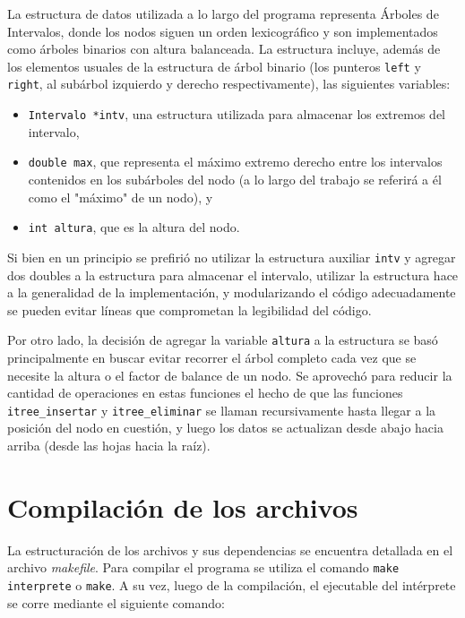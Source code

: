 \documentclass[11pt]{article}
\begin{document}
 La estructura de datos utilizada a lo largo del programa representa Árboles de Intervalos, donde los nodos siguen un orden lexicográfico y son implementados como árboles binarios con altura balanceada.
 La estructura incluye, además de los elementos usuales de la estructura de árbol binario (los punteros \verb|left| y \verb|right|, al subárbol izquierdo y derecho respectivamente), 
 las siguientes variables:
 \begin{itemize}
     \item \verb|Intervalo *intv|, una estructura utilizada para almacenar los extremos del intervalo,
     \item \verb|double max|, que representa el máximo extremo derecho entre los intervalos contenidos en los subárboles del nodo (a lo largo del trabajo se referirá a él como el "máximo" de un nodo), y
     \item \verb|int altura|, que es la altura del nodo.
 \end{itemize} \par
 
 Si bien en un principio se prefirió no utilizar la estructura auxiliar \verb|intv| y agregar dos doubles a la estructura para almacenar el intervalo, utilizar la estructura hace a la generalidad de la implementación, y modularizando el código adecuadamente se pueden evitar líneas que comprometan la legibilidad del código. \par

 Por otro lado, la decisión de agregar la variable \verb|altura| a la estructura se basó principalmente en buscar evitar recorrer el árbol completo cada vez que se necesite la altura o el factor de balance de un nodo. Se aprovechó para reducir la cantidad de operaciones en estas funciones el hecho de que las funciones \verb|itree_insertar| y \verb|itree_eliminar| se llaman recursivamente hasta llegar a la posición del nodo en cuestión, y luego los datos se actualizan desde abajo hacia arriba (desde las hojas hacia la raíz). \par
 
 
 \section{Compilación de los archivos}
 
 La estructuración de los archivos y sus dependencias se encuentra detallada en el archivo \textit{makefile}. 
 Para compilar el programa se utiliza el comando \verb|make interprete| o \verb|make|. A su vez, luego de la compilación, el ejecutable del intérprete se corre mediante el siguiente comando:\par
 
\end{document}
